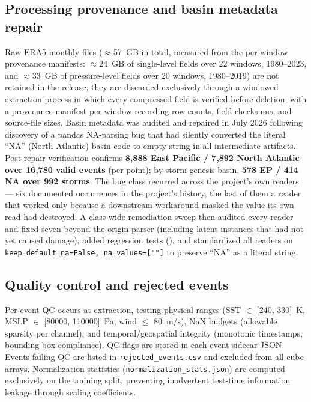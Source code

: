 \documentclass[11pt]{article}
\newcommand{\code}[1]{\path{#1}}
\begin{document}
\subsection{Processing provenance and basin metadata repair}

Raw ERA5 monthly files ($\approx$57~GB in total, measured from the per-window
provenance manifests: $\approx$24~GB of single-level fields over 22 windows,
1980--2023, and $\approx$33~GB of pressure-level fields over 20 windows,
1980--2019) are not retained in the release; they are discarded exclusively
through a windowed extraction process in which every compressed field is
verified before deletion, with a provenance manifest per window recording row
counts, field checksums, and source-file sizes. Basin metadata was audited and
repaired in July 2026 following discovery of a pandas NA-parsing bug that had
silently converted the literal ``NA'' (North Atlantic) basin code to empty
string in all intermediate artifacts. Post-repair verification confirms
\textbf{8{,}888 East Pacific / 7{,}892 North Atlantic over 16{,}780 valid
events} (per point); by storm genesis basin, \textbf{578 EP / 414 NA over 992
storms}. The bug class recurred across the project's own readers --- six
documented occurrences in the project's history, the last of them a reader that
worked only because a downstream workaround masked the value its own read had
destroyed. A class-wide remediation sweep then audited every reader and fixed
seven beyond the origin parser (including latent instances that had not yet
caused damage), added regression tests
(\code{tests/test_na_handling_readers.py}), and standardized all readers
on \texttt{keep\_default\_na=False, na\_values=[""]} to preserve ``NA'' as a
literal string.

\subsection{Quality control and rejected events}

Per-event QC occurs at extraction, testing physical ranges (SST $\in$ [240,
330]~K, MSLP $\in$ [80000, 110000]~Pa, wind $\leq$ 80~m/s), NaN budgets
(allowable sparsity per channel), and temporal/geospatial integrity (monotonic
timestamps, bounding box compliance). QC flags are stored in each event sidecar
JSON. Events failing QC are listed in \texttt{rejected\_events.csv} and
excluded from all cube arrays. Normalization statistics
(\texttt{normalization\_stats.json}) are computed exclusively on the training
split, preventing inadvertent test-time information leakage through scaling
coefficients.
\end{document}
